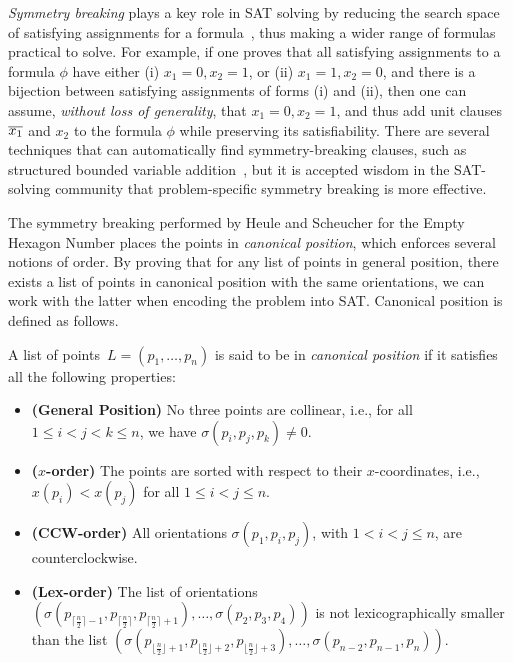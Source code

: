 \emph{Symmetry breaking} plays a key role in SAT solving by reducing the search space of satisfying assignments for a formula~\cite{biereHandbookSatisfiabilityVolume2009,Crawford},
thus making a wider range of formulas practical to solve.
For example, if one proves that all satisfying assignments to a formula $\phi$ have either (i) $x_1 = 0, x_2 = 1$, or  (ii) $x_1 = 1, x_2 = 0$, and there is a bijection between satisfying assignments of forms (i) and (ii),
then one can assume, \emph{without loss of generality}, that $x_1 = 0, x_2 = 1$, and thus add unit clauses $\overline{x_1}$ and $x_2$ to the formula $\phi$ while preserving its satisfiability.
There are several techniques that can automatically find symmetry-breaking clauses,
such as structured bounded variable addition~\cite{sbva},
but it is accepted wisdom in the SAT-solving community that problem-specific symmetry breaking is more effective.

The symmetry breaking performed by Heule and Scheucher for the Empty Hexagon Number places the points in \emph{canonical position},
which enforces several notions of order.
By proving that for any list of points in general position,
there exists a list of points in canonical position with the same orientations,
we can work with the latter when encoding the problem into SAT.
Canonical position is defined as follows.
\begin{definition}
A list of points~$L = (p_1,\ldots, p_{n})$ is said to be in \emph{canonical position} if it satisfies all the following properties:
\begin{itemize}
    \item \textbf{(General Position)} No three points are collinear, i.e., for all $1 \leq i < j < k \leq n$, we have $\sigma(p_i, p_j, p_k) \neq 0$.
    \item \textbf{($x$-order)} The points are sorted with respect to their $x$-coordinates, i.e., $x(p_i) < x(p_j)$ for all $1 \leq i < j \leq n$.
    \item \textbf{(CCW-order)} All orientations $\sigma(p_1, p_i, p_j)$, with $1 < i < j \leq n$, are counterclockwise.
    \item \textbf{(Lex-order)} The list of orientations \( \left(\sigma\left(p_{\lceil \frac{n}{2} \rceil -1}, p_{\lceil \frac{n}{2} \rceil},p_{\lceil \frac{n}{2} \rceil+1}\right), \ldots, \sigma\left(p_2, p_3, p_4\right) \right)\) is not lexicographically smaller than the list \(\left(\sigma\left(p_{\lfloor \frac{n}{2} \rfloor  + 1}, p_{\lfloor \frac{n}{2} \rfloor+2},p_{\lfloor \frac{n}{2} \rfloor+3}\right), \ldots, \sigma\left(p_{n-2}, p_{n-1}, p_{n}\right) \right).\)
\end{itemize}
\end{definition}

